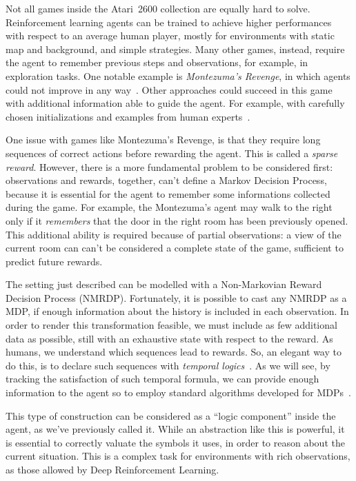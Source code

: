 Not all games inside the Atari~2600 collection are equally hard to solve.
Reinforcement learning agents can be trained to achieve higher performances
with respect to an average human player, mostly for environments with static
map and background, and simple strategies. Many other games, instead, require
the agent to remember previous steps and observations, for example, in
exploration tasks. One notable example is \emph{Montezuma's Revenge}, in which
agents could not improve in any way~\cite{bib:atari-deepq-nature}.
Other approaches could succeed in this game with additional information able
to guide the agent. For example, with carefully chosen initializations and
examples from human experts~\cite{bib:mz-openai-demonstrations}.

One issue with games like Montezuma's Revenge, is that they require long
sequences of correct actions before rewarding the agent. This is called a
\emph{sparse reward}. However, there is a more fundamental problem to be
considered first: observations and rewards, together, can't define a Markov
Decision Process, because it is essential for the agent to remember some
informations collected during the game. For example, the Montezuma's agent may
walk to the right only if it \emph{remembers} that the door in the right room
has been previously opened. This additional ability is required because of 
partial observations: a view of the current room can can't be considered a
complete state of the game, sufficient to predict future rewards.

The setting just described can be modelled with a Non-Markovian Reward
Decision Process (NMRDP). Fortunately, it is possible to cast any NMRDP as a
MDP, if enough information about the history is included in each observation.
In order to render this transformation feasible, we must include as few
additional data as possible, still with an exhaustive state with respect to
the reward. As humans, we understand which sequences lead to rewards. So, an
elegant way to do this, is to declare such sequences with \emph{temporal
logics}~\cite{bib:nmrdp-logic-first}. As we will see, by tracking the
satisfaction of such temporal formula, we can provide enough information to
the agent so to employ standard algorithms developed for
MDPs~\cite{bib:degiacomo-logic-nmrdp}\cite{bib:favorito-thesis}.

This type of construction can be considered as a ``logic component'' inside
the agent, as we've previously called it. While an abstraction like this is
powerful, it is essential to correctly valuate the symbols it uses, in order
to reason about the current situation. This is a complex task for environments
with rich observations, as those allowed by Deep Reinforcement Learning.


